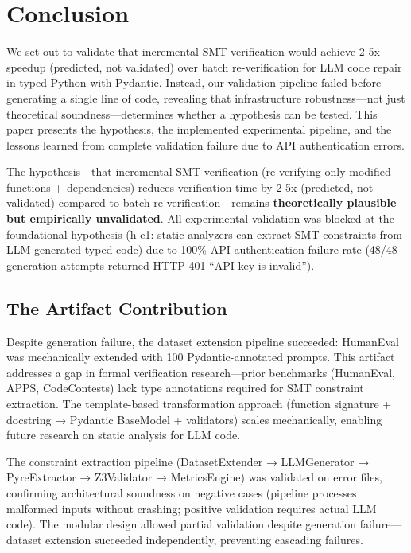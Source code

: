 \section{Conclusion}

We set out to validate that incremental SMT verification would achieve 2-5x speedup (predicted, not validated) over batch re-verification for LLM code repair in typed Python with Pydantic. Instead, our validation pipeline failed before generating a single line of code, revealing that infrastructure robustness---not just theoretical soundness---determines whether a hypothesis can be tested. This paper presents the hypothesis, the implemented experimental pipeline, and the lessons learned from complete validation failure due to API authentication errors.

The hypothesis---that incremental SMT verification (re-verifying only modified functions + dependencies) reduces verification time by 2-5x (predicted, not validated) compared to batch re-verification---remains \textbf{theoretically plausible but empirically unvalidated}. All experimental validation was blocked at the foundational hypothesis (h-e1: static analyzers can extract SMT constraints from LLM-generated typed code) due to 100\% API authentication failure rate (48/48 generation attempts returned HTTP 401 ``API key is invalid'').

\subsection{The Artifact Contribution}

Despite generation failure, the dataset extension pipeline succeeded: HumanEval was mechanically extended with 100 Pydantic-annotated prompts. This artifact addresses a gap in formal verification research---prior benchmarks (HumanEval, APPS, CodeContests) lack type annotations required for SMT constraint extraction. The template-based transformation approach (function signature + docstring → Pydantic BaseModel + validators) scales mechanically, enabling future research on static analysis for LLM code.

The constraint extraction pipeline (DatasetExtender → LLMGenerator → PyreExtractor → Z3Validator → MetricsEngine) was validated on error files, confirming architectural soundness on negative cases (pipeline processes malformed inputs without crashing; positive validation requires actual LLM code). The modular design allowed partial validation despite generation failure---dataset extension succeeded independently, preventing cascading failures.

